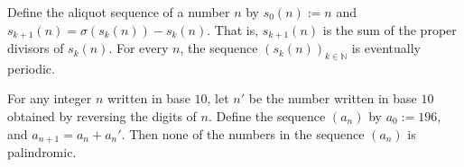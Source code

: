 \begin{conjecture} Define the aliquot sequence of a number $n$ by $s_0(n):=n$ and $s_{k+1}(n)=\sigma(s_k(n))-s_k(n)$. That is, $s_{k+1}(n)$ is the sum of the proper divisors of $s_k(n)$. For every $n$, the sequence $(s_k(n))_{k\in\mathbb{N}}$ is eventually periodic.
\end{conjecture}

\begin{conjecture}
  For any integer $n$ written in base $10$, let $n'$ be the number written in base $10$ obtained by reversing the digits of $n$. Define the sequence $(a_n)$ by $a_0:=196$, and $a_{n+1}=a_n+a_n'$. Then none of the numbers in the sequence $(a_n)$ is palindromic.
\end{conjecture}

